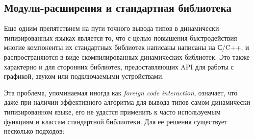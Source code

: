 

\subsection{Модули-расширения и стандартная библиотека}
\label{sec:extensions-and-stdlib}

Еще одним препятствием на пути точного вывода типов в динамически типизированных
языках является то, что с целью повышения быстродействия многие компоненты их
стандартных библиотек написаны написаны на С/C++, и распространяются в виде
скомпилированных динамических библиотек. Это также характерно и для сторонних
библиотек, предоставляющих API для работы с графикой, звуком или подключаемыми
устройствами.

Эта проблема, упоминаемая иногда как \emph{foreign code interaction}, означает, что даже при
наличии эффективного алгоритма для вывода типов самом динамически типизированном
языке, его не удастся применить к часто используемым функциям и классам
стандартной библиотеки. Для ее решения существует несколько подходов:

